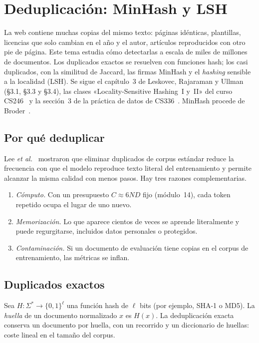 \chapter{Deduplicación: MinHash y LSH}
\label{tema:2}

La web contiene muchas copias del mismo texto: páginas idénticas, plantillas, licencias que solo cambian en el año y el autor, artículos reproducidos con otro pie de página. Este tema estudia cómo detectarlas a escala de miles de millones de documentos. Los duplicados exactos se resuelven con funciones hash; los casi duplicados, con la similitud de Jaccard, las firmas MinHash y el \emph{hashing} sensible a la localidad (LSH). Se sigue el capítulo~3 de Leskovec, Rajaraman y Ullman~\cite{mmds} (§3.1, §3.3 y §3.4), las clases «Locality-Sensitive Hashing~I y~II» del curso CS246~\cite{cs246} y la sección~3 de la práctica de datos de CS336~\cite{cs336a4}. MinHash procede de Broder~\cite{broder}.

\section{Por qué deduplicar}

Lee \emph{et al.}~\cite{lee} mostraron que eliminar duplicados de corpus estándar reduce la frecuencia con que el modelo reproduce texto literal del entrenamiento y permite alcanzar la misma calidad con menos pasos. Hay tres razones complementarias.

\begin{enumerate}
  \item \emph{Cómputo.} Con un presupuesto $C\approx 6ND$ fijo (módulo~14), cada token repetido ocupa el lugar de uno nuevo.
  \item \emph{Memorización.} Lo que aparece cientos de veces se aprende literalmente y puede regurgitarse, incluidos datos personales o protegidos.
  \item \emph{Contaminación.} Si un documento de evaluación tiene copias en el corpus de entrenamiento, las métricas se inflan.
\end{enumerate}

\section{Duplicados exactos}

\begin{definicion}[Huella]
Sea $H\colon\Sigma^{*}\to\{0,1\}^{\ell}$ una función hash de $\ell$ bits (por ejemplo, SHA-1 o MD5). La \emph{huella} de un documento normalizado $x$ es $H(x)$. La deduplicación exacta conserva un documento por huella, con un recorrido y un diccionario de huellas: coste lineal en el tamaño del corpus.
\end{definicion}

